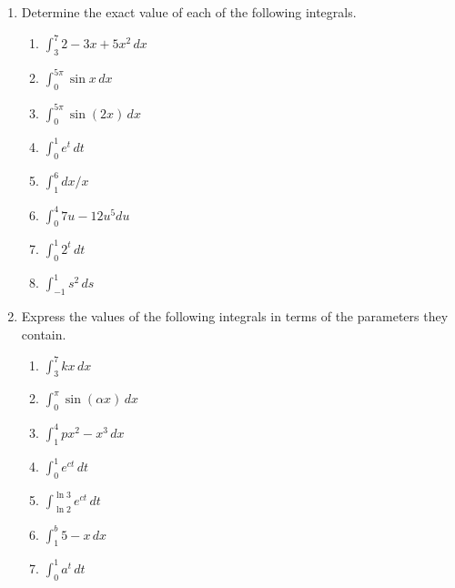 \begin{enumerate}
\item Determine the exact value of each of the following integrals.



  \begin{enumerate}
  \item ${\displaystyle \int_3^7 2 - 3x + 5x^2 \, dx}$


  \item ${\displaystyle \int_0^{5\pi} \sin{x} \, dx}$


  \item ${\displaystyle \int_0^{5\pi} \sin(2x) \, dx}$


  \item ${\displaystyle \int_0^1 e^t \, dt}$


  \item ${\displaystyle \int_1^6 dx/x}$


  \item ${\displaystyle \int_0^4 7u -12u^5 du}$


  \item ${\displaystyle \int_0^1 2^t \, dt}$


  \item ${\displaystyle \int_{-1}^1 s^2 \, ds}$
\mbox{}



\end{enumerate}
\item Express the values of the following integrals in terms of the
parameters they contain.



  \begin{enumerate}
  \item ${\displaystyle \int_3^7 kx \, dx}$


  \item ${\displaystyle \int_0^{\pi} \sin(\alpha x) \, dx}$


  \item ${\displaystyle \int_1^4 px^2 - x^3 \, dx}$


  \item ${\displaystyle \int_0^1 e^{ct} \, dt}$


  \item ${\displaystyle \int_{\ln{2}}^{\ln{3}} e^{ct} \, dt}$


  \item ${\displaystyle \int_1^b 5 - x \, dx}$


  \item ${\displaystyle \int_0^1 a^t \, dt}$



\end{enumerate}
\end{enumerate}
